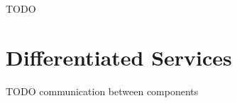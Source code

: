 \ifdraft TODO

\chapter{Differentiated Services}
\label{cha:diffserv}

TODO communication between components

\fi




